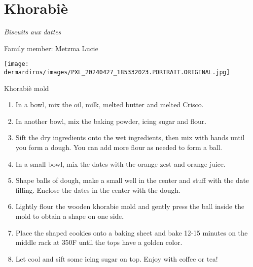 \chapter{Khorabiè}
\label{ch:khorabie}


\textit{Biscuits aux dattes}

Family member: Metzma Lucie

\begin{marginfigure}[20pt]
  \texttt{[image: dermardiros/images/PXL\_20240427\_185332023.PORTRAIT.ORIGINAL.jpg]}
  \caption{Khorabiè mold}
\end{marginfigure}

\begin{enumerate}
    \item In a bowl, mix the oil, milk, melted butter and melted Crisco.
    \item In another bowl, mix the baking powder, icing sugar and flour.
    \item Sift the dry ingredients onto the wet ingredients, then mix with hands until you form a dough. You can add more flour as needed to form a ball.
    \item In a small bowl, mix the dates with the orange zest and orange juice.
    \item Shape balls of dough, make a small well in the center and stuff with the date filling. Enclose the dates in the center with the dough. 
    \item Lightly flour the wooden khorabie mold and gently press the ball inside the mold to obtain a shape on one side.
    \item Place the shaped cookies onto a baking sheet and bake 12-15 minutes on the middle rack at 350\degree F until the tops have a golden color. 
    \item Let cool and sift some icing sugar on top. Enjoy with coffee or tea!
\end{enumerate}
